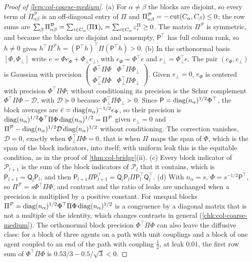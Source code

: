 \begin{proof}[Proof of \cref{lem:col-coarse-medium}]
(a) For $\alpha\neq\beta$ the blocks are disjoint, so every term of $\Pi^{\mathcal P}_{\alpha\beta}$ is an off-diagonal entry of $\Pi$ and $\Pi^{\mathcal P}_{\alpha\beta}=-\operatorname{cut}(C_\alpha,C_\beta)\le0$; the row sums are $\sum_\beta\Pi^{\mathcal P}_{\alpha\beta}=\sum_{i\in C_\alpha}(\Pi\mathbf{1})_i=\sum_{i\in C_\alpha}\varepsilon^\Pi_i\ge0$. The matrix $\Pi^{\mathcal P}$ is symmetric, and because the blocks are disjoint and nonempty, $\mathsf P^\top$ has full column rank, so $h\neq0$ gives $h^\top\Pi^{\mathcal P}h=(\mathsf P^\top h)^\top\Pi(\mathsf P^\top h)>0$. (b) In the orthonormal basis $[\Phi,\Phi_\perp]$ write $e=\Phi e_\Phi+\Phi_\perp e_\perp$, with $e_\Phi=\Phi^\top e$ and $e_\perp=\Phi_\perp^\top e$. The pair $(e_\Phi,e_\perp)$ is Gaussian with precision $\begin{pmatrix}\Phi^\top\Pi\Phi&\Phi^\top\Pi\Phi_\perp\\\Phi_\perp^\top\Pi\Phi&\Phi_\perp^\top\Pi\Phi_\perp\end{pmatrix}$. Given $e_\perp=0$, $e_\Phi$ is centered with precision $\Phi^\top\Pi\Phi$; without conditioning its precision is the Schur complement $\Phi^\top\Pi\Phi-\mathcal D$, with $\mathcal D\succeq0$ because $\Phi_\perp^\top\Pi\Phi_\perp\succ0$. Since $\mathsf P=\operatorname{diag}(n_\alpha)^{1/2}\Phi^\top$, the block averages are $\bar e=\operatorname{diag}(n_\alpha)^{-1/2}e_\Phi$, so their precision is $\operatorname{diag}(n_\alpha)^{1/2}\Phi^\top\Pi\Phi\operatorname{diag}(n_\alpha)^{1/2}=\Pi^{\mathcal P}$ given $e_\perp=0$ and $\Pi^{\mathcal P}-\operatorname{diag}(n_\alpha)^{1/2}\mathcal D\operatorname{diag}(n_\alpha)^{1/2}$ without conditioning. The correction vanishes, $\mathcal D=0$, exactly when $\Phi_\perp^\top\Pi\Phi=0$, that is when $\Pi$ maps the span of $\Phi$, which is the span of the block indicators, into itself; with uniform leak this is the equitable condition, as in the proof of \cref{thm:col-bridge}(ii). (c) Every block indicator of $\mathcal P_{l+1}$ is the sum of the block indicators of $\mathcal P_l$ that it contains, which is $\mathsf P_{l+1}=\mathsf Q_l\mathsf P_l$, and then $\mathsf P_{l+1}\Pi\mathsf P_{l+1}^\top=\mathsf Q_l\mathsf P_l\Pi\mathsf P_l^\top\mathsf Q_l^\top$. (d) With $n_\alpha=s$, $\Phi=s^{-1/2}\mathsf P^\top$, so $\Pi^{\mathcal P}=s\Phi^\top\Pi\Phi$, and contrast and the ratio of leaks are unchanged when a precision is multiplied by a positive constant. For unequal blocks $\Pi^{\mathcal P}=\operatorname{diag}(n_\alpha)^{1/2}\Phi^\top\Pi\Phi\operatorname{diag}(n_\alpha)^{1/2}$ is a congruence by a diagonal matrix that is not a multiple of the identity, which changes contrasts in general (\cref{chk:col-coarse-medium}). The orthonormal block precision $\Phi^\top\Pi\Phi$ can also leave the diffusive class: for a block of three agents on a path with unit couplings and a block of one agent coupled to an end of the path with coupling $\frac12$, at leak $0.01$, the first row sum of $\Phi^\top\Pi\Phi$ is $0.53/3-0.5/\sqrt3<0$.
\end{proof}

